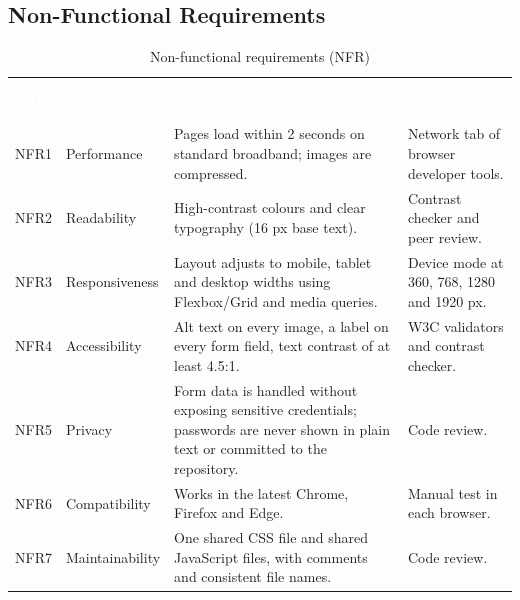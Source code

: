 \documentclass[10pt,a4paper]{article}
\newcommand{\hc}[1]{\textcolor{white}{\bfseries #1}}
\newcommand{\tbl}{\rowcolors{2}{white}{gkbg}\renewcommand{\arraystretch}{1.2}\footnotesize}
\begin{document}
\subsection{Non-Functional Requirements}
\begin{table}[H]
\centering
\caption{Non-functional requirements (NFR)}\label{tab:nfr}
\tbl
\begin{tabularx}{\textwidth}{@{}cl Y Y@{}}
\hc{ID} & \hc{Category} & \hc{Requirement} & \hc{How it will be checked}\\
NFR1 & Performance & Pages load within 2 seconds on standard broadband; images are compressed. & Network tab of browser developer tools.\\
NFR2 & Readability & High-contrast colours and clear typography (16 px base text). & Contrast checker and peer review.\\
NFR3 & Responsiveness & Layout adjusts to mobile, tablet and desktop widths using Flexbox/Grid and media queries. & Device mode at 360, 768, 1280 and 1920 px.\\
NFR4 & Accessibility & Alt text on every image, a label on every form field, text contrast of at least 4.5:1. & W3C validators and contrast checker.\\
NFR5 & Privacy & Form data is handled without exposing sensitive credentials; passwords are never shown in plain text or committed to the repository. & Code review.\\
NFR6 & Compatibility & Works in the latest Chrome, Firefox and Edge. & Manual test in each browser.\\
NFR7 & Maintainability & One shared CSS file and shared JavaScript files, with comments and consistent file names. & Code review.\\
\end{tabularx}
\end{table}
\end{document}
